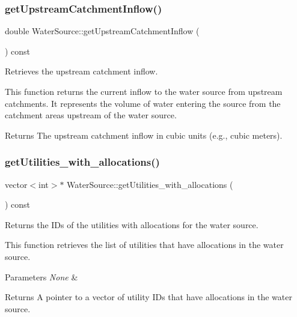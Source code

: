 \subsubsection{\texorpdfstring{get\+Upstream\+Catchment\+Inflow()}{getUpstreamCatchmentInflow()}}
{\footnotesize\ttfamily double Water\+Source\+::get\+Upstream\+Catchment\+Inflow (\begin{DoxyParamCaption}{ }\end{DoxyParamCaption}) const}



Retrieves the upstream catchment inflow. 

This function returns the current inflow to the water source from upstream catchments. It represents the volume of water entering the source from the catchment areas upstream of the water source.

\begin{DoxyReturn}{Returns}
The upstream catchment inflow in cubic units (e.\+g., cubic meters). 
\end{DoxyReturn}
\mbox{\label{classWaterSource_a41a9f1fb088f29633c9141687958c16e}} 
\subsubsection{\texorpdfstring{get\+Utilities\+\_\+with\+\_\+allocations()}{getUtilities\_with\_allocations()}}
{\footnotesize\ttfamily vector$<$int$>$$\ast$ Water\+Source\+::get\+Utilities\+\_\+with\+\_\+allocations (\begin{DoxyParamCaption}{ }\end{DoxyParamCaption}) const}



Returns the I\+Ds of the utilities with allocations for the water source. 

This function retrieves the list of utilities that have allocations in the water source.


\begin{DoxyParams}{Parameters}
{\em None} & \\
\hline
\end{DoxyParams}
\begin{DoxyReturn}{Returns}
A pointer to a vector of utility I\+Ds that have allocations in the water source. 
\end{DoxyReturn}
\mbox{\label{classWaterSource_aee22325e6af0e3c804ddbd9a3505be05}} 
